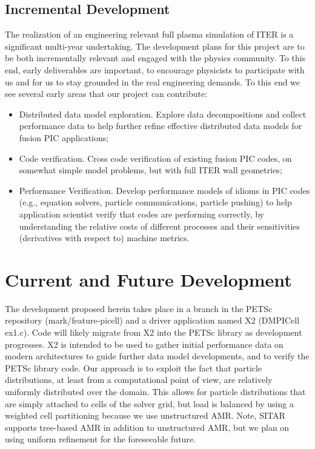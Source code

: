 \documentclass[review]{siamart}
\begin{document}
\subsection{Incremental Development}
\label{sec:id}

The realization of an engineering relevant full plasma simulation of ITER is a significant multi-year undertaking.
The development plans for this project are to be both incrementally relevant and engaged with the physics community.
To this end, early deliverables are important, to encourage physicists to participate with us and for us to stay grounded in the real engineering demands.
To this end we see several early areas that our project can contribute:
\begin{itemize}
\item Distributed data model exploration. Explore data decompositions and collect performance data to help further refine effective distributed data models for fusion PIC applications;
\item Code verification. Cross code verification of existing fusion PIC codes, on somewhat simple model problems, but with full ITER wall geometries;
\item Performance Verification.  Develop performance models of idioms in PIC codes (e.g., equation solvers, particle communications, particle pushing) to help application scientist verify that codes are performing correctly, by understanding the relative costs of different processes and their sensitivities (derivatives with respect to) machine metrics.
\end{itemize}
 

\section{Current and Future Development}
\label{sec:x2}

The development proposed herein takes place in a branch in the PETSc repository (mark/feature-picell) and a driver application named X2 (DMPICell ex1.c).
Code will likely migrate from X2 into the PETSc library as development progresses.
X2 is intended to be used to gather initial performance data on modern architectures to guide further data model developments, and to verify the PETSc library code.
Our approach is to exploit the fact that particle distributions, at least from a computational point of view, are relatively uniformly distributed over the domain.
This allows for particle distributions that are simply attached to cells of the solver grid, but load is balanced by using a weighted cell partitioning because we use unstructured AMR.
Note, SITAR supports tree-based AMR in addition to unstructured AMR, but we plan on using uniform refinement for the foreseeable future.
\end{document}
